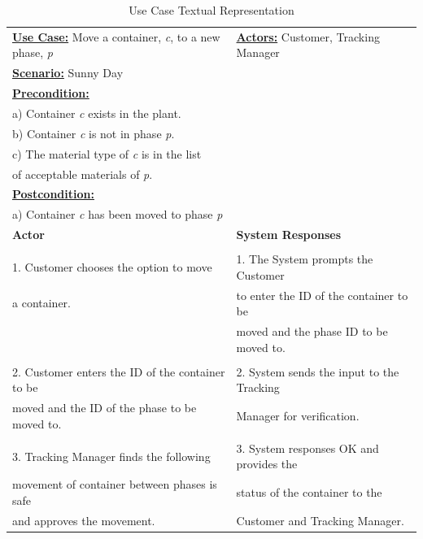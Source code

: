 \documentclass[fontsize=12pt,paper=letter,twoside]{scrartcl}
\begin{document}
\begin{table}[h]
\begin{center}
\begin{tabular}{|l|l|}
\hline
\textbf{\underline {Use Case:} } Move a container, \emph{c}, to a new phase, \emph{p} & \textbf {\underline {Actors:} } Customer, Tracking Manager
\\ \textbf{\underline {Scenario:} } Sunny Day &
\\ \textbf{\underline {Precondition:} } &
\\ a) Container \emph{c} exists in the plant. &
\\ b) Container \emph{c} is not in phase \emph{p}. &
\\ c) The material type of \emph{c} is in the list &
\\ of acceptable materials of \emph{p}. &
\\ \textbf{\underline {Postcondition:} } &
\\ a) Container \emph{c} has been moved to phase \emph{p} &

\\ \hline
\textbf{Actor} &  \textbf{System Responses}
\\ \hline &

\\ 1. Customer chooses the option to move & 1. The System prompts the Customer
\\ a container. & to enter the ID of the container to be 
\\ & moved and the phase ID to be moved to.
\\ &
\\ 2. Customer enters the ID of the container to be & 2. System sends the input to the Tracking
\\ moved and the ID of the phase to be moved to. & Manager for verification.
\\ &
\\ 3. Tracking Manager finds the following & 3. System responses OK and provides the
\\ movement of container between phases is safe & status of the container to the
\\ and approves the movement. & Customer and Tracking Manager.


\\ \hline
\end{tabular}
\end{center}
\caption {Use Case Textual Representation}
\label{tbl:uctd}
\end{table}
\end{document}
